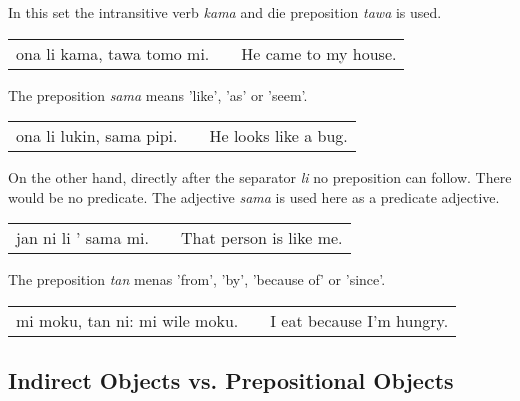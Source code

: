 %
%
In this set the intransitive verb \textit{kama} and die preposition \textit{tawa} is used.

\begin{supertabular}{p{5,5cm}|ll}
    ona li kama, tawa tomo mi. &  & He came to my house. \\
\end{supertabular}

%
%
The preposition \textit{sama} means 'like', 'as' or 'seem'.

\begin{supertabular}{p{5,5cm}|ll}
    ona li lukin, sama pipi. &  & He looks like a bug. \\
\end{supertabular}

On the other hand, directly after the separator \textit{li} no preposition can follow.
There would be no predicate.
The adjective \textit{sama} is used here as a predicate adjective.

\begin{supertabular}{p{5,5cm}|ll}
    jan ni li ' sama mi. &  & That person is like me. \\
\end{supertabular}

%

The preposition \textit{tan} menas 'from', 'by', 'because of' or 'since'.

\begin{supertabular}{p{5,5cm}|ll}
    mi moku, tan ni: mi wile moku. &  & I eat because I'm hungry. \\
\end{supertabular}

%
\subsection*{Indirect Objects vs. Prepositional Objects}
%
%

